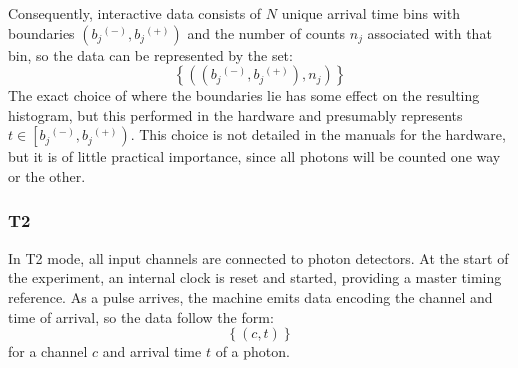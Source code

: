 \documentclass{article}
\newcommand{\braces}[1]{\ensuremath{\left\lbrace #1 \right\rbrace}}
\newcommand{\angles}[1]{\ensuremath{\left\langle #1 \right\rangle}}
\newcommand{\parens}[1]{\ensuremath{\left( #1 \right)}}
\newcommand{\gn}[1]{\ensuremath{g^{(#1)}}}
\newcommand{\channel}{\ensuremath{c}}
\newcommand{\upplus}{\ensuremath{^{(+)}}}
\newcommand{\upminus}{\ensuremath{^{(-)}}}
\newcommand{\closedopenrange}[2]{\ensuremath{\left[#1, #2\right)}}
\renewcommand{\time}{\ensuremath{t}}
\newcommand{\bin}{\ensuremath{b}}
\newcommand{\counts}{\ensuremath{n}}
\numberwithin{equation}{section}
\numberwithin{figure}{section}
\begin{document}
Consequently, interactive data consists of $N$ unique arrival time bins with boundaries $\parens{\bin_{j}\upminus, \bin_{j}\upplus}$ and the number of counts $\counts_{j}$ associated with that bin, so the data can be represented by the set:
\begin{equation}
\braces{
    \parens{
          \parens{\bin_{j}\upminus, 
                  \bin_{j}\upplus},
          \counts_{j}}}
\end{equation}
The exact choice of where the boundaries lie has some effect on the resulting histogram, but this performed in the hardware and presumably represents $\time\in\closedopenrange{\bin_{j}\upminus}{\bin_{j}\upplus}$. This choice is not detailed in the manuals for the hardware, but it is of little practical importance, since all photons will be counted one way or the other.

\subsubsection{T2}
In T2 mode, all input channels are connected to photon detectors. At the start of the experiment, an internal clock is reset and started, providing a master timing reference. As a pulse arrives, the machine emits data encoding the channel and time of arrival, so the data follow the form:
\begin{equation}
\braces{\parens{\channel, \time}}
\end{equation}
for a channel \channel{} and arrival time \time{} of a photon.
\end{document}
